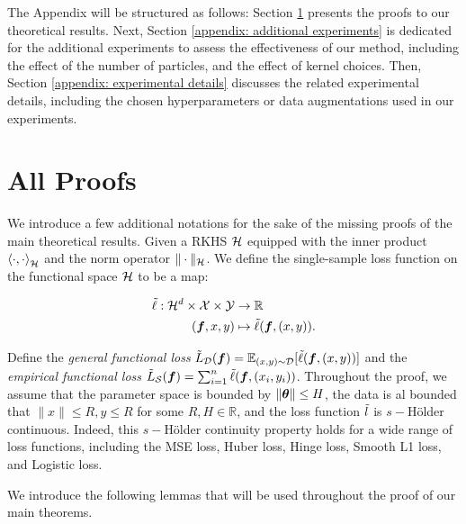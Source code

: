 
\begin{center}
\end{center}

The Appendix will be structured as follows: Section \ref{appendix: proofs} presents the proofs to our theoretical results. Next, Section \ref{appendix: additional experiments} is dedicated for the additional experiments to assess the effectiveness of our method, including the effect of the number of particles, and the effect of kernel choices. Then, Section \ref{appendix: experimental details} discusses the related experimental details, including the chosen hyperparameters or data augmentations used in our experiments.

\section{All Proofs}
\label{appendix: proofs}

We introduce a few additional notations for the sake of the missing proofs of the main theoretical results. Given a RKHS ${\mathcal{H}}$ equipped with the inner product $\left<\cdot, \cdot\right>_{\mathcal{H}}$ and the norm operator $\|\cdot \|_{\mathcal{H}}$. We define the single-sample loss function on the functional space ${\mathcal{H}}$ to be a map:

\begin{align*}
    \Tilde{\ell}: {\mathcal{H}}^d \times {\mathcal{X}} \times {\mathcal{Y}} &\to \mathbb{R}\\
    ({\bm{f}}, x, y) &\mapsto \Tilde{\ell}({\bm{f}}, (x, y)).
\end{align*}
 
Define the \textit{general functional loss} $\Tilde{L}_{\mathcal{D}}({\bm{f}}) = \mathbb{E}_{(x, y) \sim {\mathcal{D}}}[\Tilde{\ell}({\bm{f}}, (x, y))]$ and the \textit{empirical functional loss} $\Tilde{L}_{\mathcal{S}}({\bm{f}}) = \sum_{i=1}^n\Tilde{\ell}({\bm{f}}, (x_i, y_i))$. Throughout the proof, we assume that the parameter space is bounded by $\|{\bm{\theta}}\| \leq H$, the data is al bounded that $\|x\| \leq R, y \leq R$ for some $R, H \in \mathbb{R}$, and the loss function $\Tilde{l}$ is $s-$Hölder continuous. Indeed, this $s-$Hölder continuity property holds for a wide range of loss functions, including the MSE loss, Huber loss, Hinge loss, Smooth L1 loss, and Logistic loss.

We introduce the following lemmas that will be used throughout the proof of our main theorems.

